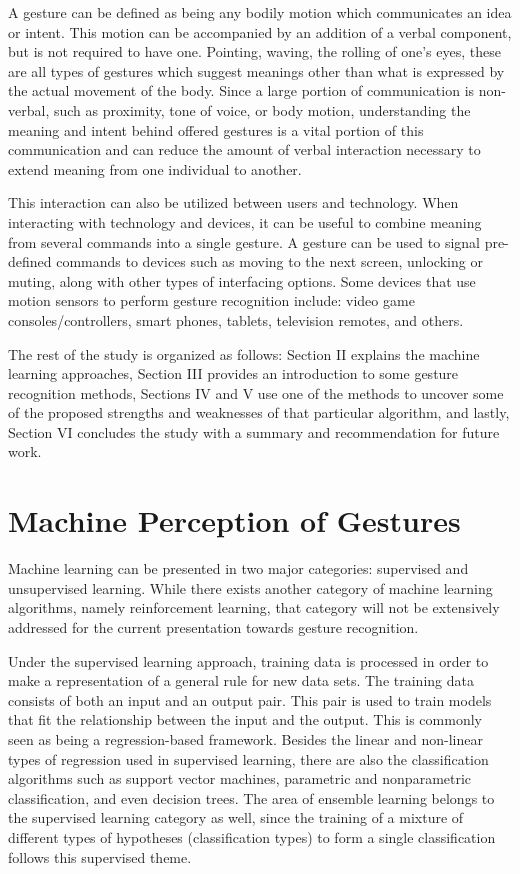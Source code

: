 \documentclass[conference]{IEEEtran}
\begin{document}
A gesture can be defined as being any bodily motion which communicates an idea or intent. This motion can be accompanied by an addition of a verbal component, but is not required to have one. Pointing, waving, the rolling of one's eyes, these are all types of gestures which suggest meanings other than what is expressed by the actual movement of the body. Since a large portion of communication is non-verbal, such as proximity, tone of voice, or body motion, understanding the meaning and intent behind offered gestures is a vital portion of this communication and can reduce the amount of verbal interaction necessary to extend meaning from one individual to another.

This interaction can also be utilized between users and technology. When interacting with technology and devices, it can be useful to combine meaning from several commands into a single gesture. A gesture can be used to signal pre-defined commands to devices such as moving to the next screen, unlocking or muting, along with other types of interfacing options. Some devices that use motion sensors to perform gesture recognition include: video game consoles/controllers, smart phones, tablets, television remotes, and others.

The rest of the study is organized as follows: Section II explains the machine learning approaches, Section III provides an introduction to some gesture recognition methods, Sections IV and V use one of the methods to uncover some of the proposed strengths and weaknesses of that particular algorithm, and lastly, Section VI concludes the study with a summary and recommendation for future work.

\section{Machine Perception of Gestures}
Machine learning can be presented in two major categories: supervised and unsupervised learning. While there exists another category of machine learning algorithms, namely reinforcement learning, that category will not be extensively addressed for the current presentation towards gesture recognition.

Under the supervised learning approach, training data is processed in order to make a representation of a general rule for new data sets. The training data consists of both an input and an output pair. This pair is used to train models that fit the relationship between the input and the output. This is commonly seen as being a regression-based framework. Besides the linear and non-linear types of regression used in supervised learning, there are also the classification algorithms such as support vector machines, parametric and nonparametric classification, and even decision trees. The area of ensemble learning belongs to the supervised learning category as well, since the training of a mixture of different types of hypotheses (classification types) to form a single classification follows this supervised theme.
\end{document}

